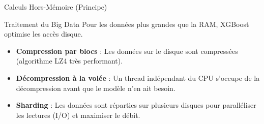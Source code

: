 \begin{frame}{ Calculs Hors-Mémoire (Principe)}
    \begin{block}{Traitement du Big Data}
        \small
        Pour les données plus grandes que la RAM, XGBoost optimise les accès disque.
    \end{block}
    
    \vspace{0.3cm}
    \begin{itemize}
        \item \textbf{Compression par blocs} : Les données sur le disque sont compressées (algorithme LZ4 très performant).
        \item \textbf{Décompression à la volée} : Un thread indépendant du CPU s'occupe de la décompression avant que le modèle n'en ait besoin.
        \item \textbf{Sharding} : Les données sont réparties sur plusieurs disques pour paralléliser les lectures (I/O) et maximiser le débit.
    \end{itemize}
\end{frame}

